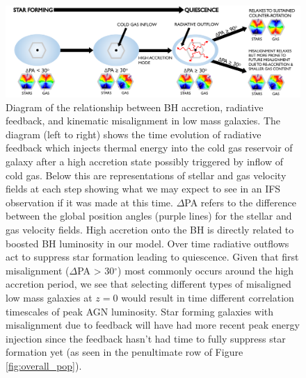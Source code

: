 \documentclass[fleqn,usenatbib]{mnras}
\begin{document}

\begin{figure}
	\includegraphics[width=\linewidth]{quasar_mode_feedback_compressed.pdf}
    \caption{Diagram of the relationship between BH accretion, radiative feedback, and kinematic misalignment in low mass galaxies. The diagram (left to right) shows the time evolution of radiative feedback which injects thermal energy into the cold gas reservoir of galaxy after a high accretion state possibly triggered by inflow of cold gas. Below this are representations of stellar and gas velocity fields at each step showing what we may expect to see in an IFS observation if it was made at this time. $\Delta$PA refers to the difference between the global position angles (purple lines) for the stellar and gas velocity fields. High accretion onto the BH is directly related to boosted BH luminosity in our model. Over time radiative outflows act to suppress star formation leading to quiescence. Given that first misalignment ($\Delta$PA > 30$^{\circ}$) most commonly occurs around the high accretion period, we see that selecting different types of misaligned low mass galaxies at $z=0$ would result in time different correlation timescales of peak AGN luminosity. Star forming galaxies with misalignment due to feedback will have had more recent peak energy injection since the feedback hasn't had time to fully suppress star formation yet (as seen in the penultimate row of Figure \ref{fig:overall_pop}).}
    \label{fig:diagram}
\end{figure}
\end{document}
